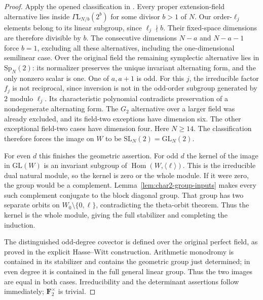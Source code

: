 \begin{proof}
Apply the opened classification in
\cite[Lemma~3.3, p.~6]{ChurikovVasilevZvezdina2022}.
Every proper extension-field alternative lies inside
$\Gamma\mathrm L_{N/b}(2^b)$ for some divisor $b>1$ of $N$.
Our order-$\ell_j$ elements belong to its linear subgroup,
since $\ell_j\nmid b$. Their fixed-space dimensions are therefore
divisible by $b$. The consecutive dimensions $N-a$ and $N-a-1$
force $b=1$, excluding all these alternatives, including the
one-dimensional semilinear case. Over the original field the
remaining symplectic alternative lies in $\mathrm{Sp}_N(2)$:
its normalizer preserves the unique invariant alternating form,
and the only nonzero scalar is one. One of $a,a+1$ is odd.
For this $j$, the irreducible factor $f_j$ is not reciprocal,
since inversion is not in the odd-order subgroup generated by
$2$ modulo $\ell_j$. Its characteristic polynomial contradicts
preservation of a nondegenerate alternating form. The $G_2$
alternative over a larger field was already excluded, and its
field-two exceptions have dimension six. The other exceptional
field-two cases have dimension four. Here $N\ge14$.
The classification therefore forces the image on $W$ to be
$\mathrm{SL}_N(2)=\mathrm{GL}_N(2)$.

For even $d$ this finishes the geometric assertion. For odd $d$
the kernel of the image in $\mathrm{GL}(W)$ is an invariant
subgroup of $\operatorname{Hom}(W,\langle\ell\rangle)$.
This is the irreducible dual natural module, so the kernel is
zero or the whole module. If it were zero, the group would be a
complement. Lemma~\ref{lem:char2-group-inputs} makes every such
complement conjugate to the block diagonal group. That group has
two separate orbits on $W_0\setminus\{0,\ell\}$, contradicting
the theta-orbit theorem. Thus the kernel is the whole module,
giving the full stabilizer and completing the induction.

The distinguished odd-degree covector is defined over the original
perfect field, as proved in the explicit Hasse--Witt construction.
Arithmetic monodromy is contained in its stabilizer and contains
the geometric group just determined; in even degree it is
contained in the full general linear group. Thus the two images
are equal in both cases. Irreducibility and the determinant
assertions follow immediately; $\mathbf F_2^\times$ is trivial.
\end{proof}

